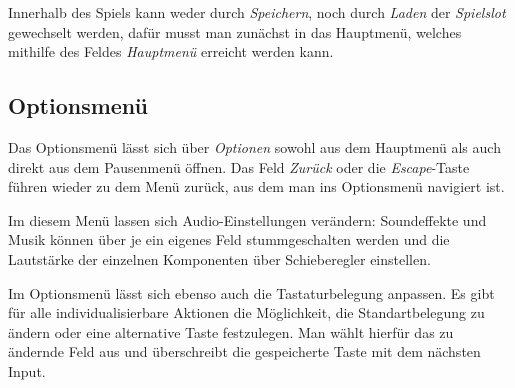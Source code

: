 Innerhalb des Spiels kann weder durch \textit{Speichern}, noch durch
\textit{Laden} der \textit{Spielslot} gewechselt werden, dafür musst man
zunächst in das Hauptmenü, welches mithilfe des Feldes \textit{Hauptmenü}
erreicht werden kann.

\subsection{Optionsmenü}\label{sec:menu-options}

Das Optionsmenü lässt sich über \textit{Optionen} sowohl aus dem Hauptmenü als
auch direkt aus dem Pausenmenü öffnen. Das Feld \textit{Zurück} oder die
\textit{Escape}-Taste führen wieder zu dem Menü zurück, aus dem man ins
Optionsmenü navigiert ist.

Im diesem Menü lassen sich Audio-Einstellungen verändern: Soundeffekte und
Musik können über je ein eigenes Feld stummgeschalten werden und die Lautstärke
der einzelnen Komponenten über Schieberegler einstellen.

Im Optionsmenü lässt sich ebenso auch die Tastaturbelegung anpassen. Es gibt
für alle individualisierbare Aktionen die Möglichkeit, die Standartbelegung zu
ändern oder eine alternative Taste festzulegen. Man wählt hierfür das zu
ändernde Feld aus und überschreibt die gespeicherte Taste mit dem nächsten
Input.
